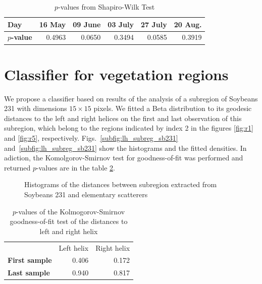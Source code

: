 \documentclass[12pt]{article}
\begin{document}
\begin{table}[hbt]
  \centering
  \caption{$p$-values from Shapiro-Wilk Test}
  \label{tab:pvalues_purities}
  \begin{tabular}{lrrrrr}
    \toprule
    \textbf{Day} & \textbf{16 May} & \textbf{09 June} & \textbf{03 July} & \textbf{27 July} & \textbf{20 Aug.}\\\midrule
    \textbf{$p$-value} & 0.4963 & 0.0650 & 0.3494 & 0.0585 & 0.3919\\
    \bottomrule
  \end{tabular}
\end{table}

\section{Classifier for vegetation regions}

We propose a classifier based on results of the analysis of a subregion of Soybeans 231 with dimensions $15\times 15$ pixels. We fitted a Beta distribution to its geodesic distances to the left and right helices on the first and last observation of this subregion, which belong to the regions indicated by index 2 in the figures \ref{fig:r1} and \ref{fig:r5}, respectively. Figs.~\ref{subfig:lh_subreg_sb231} and~\ref{subfig:lh_subreg_sb231} show the histograms and the fitted densities.
In adiction, the Komolgorov-Smirnov test for goodness-of-fit was performed and returned $p$-values are in the table \ref{tab:pvalues_table_lh_rh}.

\begin{figure}[hbt]
  \caption{Histograms of the distances between subregion extracted from Soybeans 231 and elementary scatterers}
  \label{fig:hist_lh_rh}
\end{figure}

\begin{table}[hbt]
  \centering
  \caption{$p$-values of the Kolmogorov-Smirnov goodness-of-fit test of the distances to left and right helix}\label{tab:pvalues_table_lh_rh}
  \begin{tabular}{lrr}
    \toprule
    & Left helix & Right helix\\
    \cmidrule{2-3}
    \textbf{First sample} & 0.406 & 0.172\\
    \textbf{Last sample} & 0.940 & 0.817\\
    \bottomrule
  \end{tabular}
\end{table}
\end{document}
